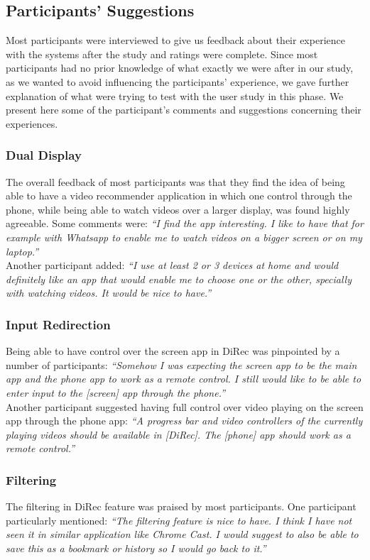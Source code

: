 \subsection{Participants' Suggestions}
Most participants were interviewed to give us feedback about their experience
with the systems after the study and ratings were complete. Since most
participants had no prior knowledge of what exactly we were after in our study,
as we wanted to avoid influencing the participants' experience, we gave further
explanation of what were trying to test with the user study in this phase.
We present here some of the participant's comments and suggestions concerning their
experiences.
\subsubsection{Dual Display}
The overall feedback of most participants was that they find the idea of being
able to have a video recommender application in which one control through the
phone, while being able to watch videos over a larger display, was found highly
agreeable. Some comments were: \textit{``I find the app interesting. I like to
have that for example with Whatsapp to enable me to watch videos on a bigger screen or on my laptop.''}\\
Another participant added: \textit{``I use at least 2 or 3 devices at home and
would definitely like an app that would enable me to choose one or the other, specially with watching videos. It
would be nice to have.''}  
\subsubsection{Input Redirection}
Being able to have control over the screen app in DiRec was pinpointed by a
number of participants: \textit{``Somehow I was expecting the screen app to be
the main app and the phone app to work as a remote control. I still would like to be able to
enter input to the [screen] app through the phone.''}\\
Another participant suggested having full control over video playing on the
screen app through the phone app: \textit{``A progress bar and video controllers
of the currently playing videos should be available in [DiRec]. The [phone] app should work as a remote
control.''}
\subsubsection{Filtering}
The filtering in DiRec feature was praised by most participants. One participant
particularly mentioned: \textit{``The filtering feature is nice to have. I think
I have not seen it in similar application like Chrome Cast. I would suggest to also be able to save this as
a bookmark or history so I would go back to it.''}
